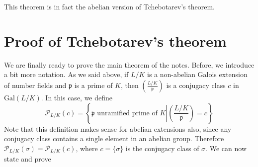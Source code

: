 \documentclass[]{amsart}
\newcommand{\p}{\mathfrak{p}}
\newcommand{\PP}{\mathcal{P}}
\newcommand{\Frob}[2]{\left(\frac{#1}{#2}\right )}
\newcommand{\Gal}{\text{Gal}}
\begin{document}
		This theorem is in fact the abelian version of Tchebotarev's theorem.
		
		\section{Proof of Tchebotarev's theorem}
		We are finally ready to prove the main theorem of the notes. Before, we introduce a bit more notation. As we said above, if $L/K$ is a non-abelian Galois extension of number fields and $\p$ is a prime of $K$, then $\Frob{L/K}{\p}$ is a conjugacy class $c$ in $\Gal(L/K)$. In this case, we define 
		\[\PP_{L/K}(c)=\left \{\p\text{ unramified prime of }K\left |\Frob{L/K}{\p}=c\right .\right \}\]
		Note that this definition makes sense for abelian extensions also, since any conjugacy class contains a single element in an abelian group. Therefore $\PP_{L/K}(\sigma)=\PP_{L/K}(c)$, where $c=\{\sigma\}$ is the conjugacy class of $\sigma$. We can now state and prove
		
\end{document}
